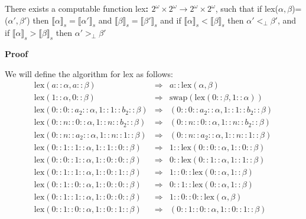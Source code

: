 \documentclass{cs4rep}
\begin{document}
\begin{myprop}
  There exists a computable function lex{\bf : $2^{\omega} \times
    2^{\omega} \rightarrow 2^{\omega} \times 2^{\omega}$}, such that
  if lex($\alpha,\beta$)=($\alpha',\beta'$) then $ \llbracket \alpha
  \rrbracket_{s} = \llbracket \alpha' \rrbracket_{s} $ and $\llbracket
  \beta \rrbracket_{s} = \llbracket \beta' \rrbracket_{s}$ and if
  $\llbracket \alpha \rrbracket_{s} < \llbracket \beta \rrbracket_{s}$
  then $\alpha' <_{\perp} \beta'$, and if $\llbracket \alpha
  \rrbracket_{s} > \llbracket \beta \rrbracket_{s}$ then $\alpha'
  >_{\perp} \beta'$
\end{myprop}

{\bf Proof}

We will define the algorithm for lex as follows:
\begin{eqnarray}
\mbox{lex}(a::\alpha,a::\beta) & \Rightarrow & a::\mbox{lex}(\alpha,\beta) \label{eq:lex1}\\
\mbox{lex}(1::\alpha,0::\beta) & \Rightarrow & \mbox{swap}(\mbox{lex}(0::\beta,1::\alpha)) \label{eq:lex2}\\ 
\mbox{lex}(0::0::a_{2}::\alpha, 1::1::b_{2}::\beta) & \Rightarrow & (0::0::a_{2}::\alpha, 1::1::b_{2}::\beta) \label{eq:lex3}\\
\mbox{lex}(0::n::0::\alpha, 1::n::b_{2}::\beta) & \Rightarrow & (0::n::0::\alpha, 1::n::b_{2}::\beta) \label{eq:lex4}\\
\mbox{lex}(0::n::a_{2}::\alpha, 1::n::1::\beta) & \Rightarrow & (0::n::a_{2}::\alpha, 1::n::1::\beta) \label{eq:lex5}\\
\mbox{lex}(0::1::1::\alpha, 1::1::0::\beta) & \Rightarrow & 1::\mbox{lex}(0::0::\alpha,1::0::\beta) \label{eq:lex6}\\
\mbox{lex}(0::0::1::\alpha, 1::0::0::\beta) & \Rightarrow & 0::\mbox{lex}(0::1::\alpha, 1::1::\beta) \label{eq:lex7}\\
\mbox{lex}(0::1::1::\alpha, 1::0::1::\beta) & \Rightarrow & 1::0::\mbox{lex}(0::\alpha,1::\beta) \label{eq:lex8}\\
\mbox{lex}(0::1::0::\alpha, 1::0::0::\beta) & \Rightarrow & 0::1::\mbox{lex}(0::\alpha,1::\beta) \label{eq:lex9}\\
\mbox{lex}(0::1::1::\alpha, 1::0::0::\beta) & \Rightarrow & 1::0::0::\mbox{lex}(\alpha,\beta) \label{eq:lex10}\\
\mbox{lex}(0::1::0::\alpha, 1::0::1::\beta) & \Rightarrow & (0::1::0::\alpha,1::0::1::\beta) \label{eq:lex11}
\end{eqnarray}
\end{document}
